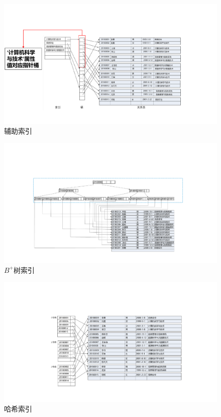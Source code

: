 \documentclass[12pt, oneside]{ctexart}
\numberwithin{figure}{section}
\numberwithin{table}{section}
\begin{document}
\begin{figure}[!htbp]
    \centering
    \includegraphics[width=13cm]{images/sec9/辅助索引.pdf}
    \caption{辅助索引}
    \label{fig:辅助索引}
\end{figure}

\begin{figure}[!htbp]
    \centering
    \includegraphics[width=13cm]{images/sec9/B+树索引.pdf}
    \caption{$B^+$树索引}
    \label{fig:B+树索引}
\end{figure}

\newpage

\begin{figure}[!htbp]
    \centering
    \includegraphics[width=13cm]{images/sec9/哈希索引.pdf}
    \caption{哈希索引}
    \label{fig:哈希索引}
\end{figure}
\end{document}
